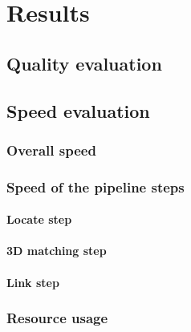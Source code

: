 \chapter{Results}
\label{chap:results}

\section{Quality evaluation}

\section{Speed evaluation}
\subsection{Overall speed}
\subsection{Speed of the pipeline steps}
\subsubsection{Locate step}
\subsubsection{3D matching step}
\subsubsection{Link step}
\subsection{Resource usage}
